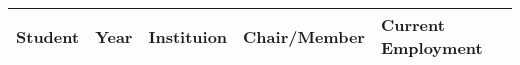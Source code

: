 
\begin{longtable}{lp{1.5cm} p{4.5cm}p{2cm}p{4cm}}
Student & Year & Instituion & Chair/Member & Current Employment\\
\hline 
\endhead 

\end{longtable}

